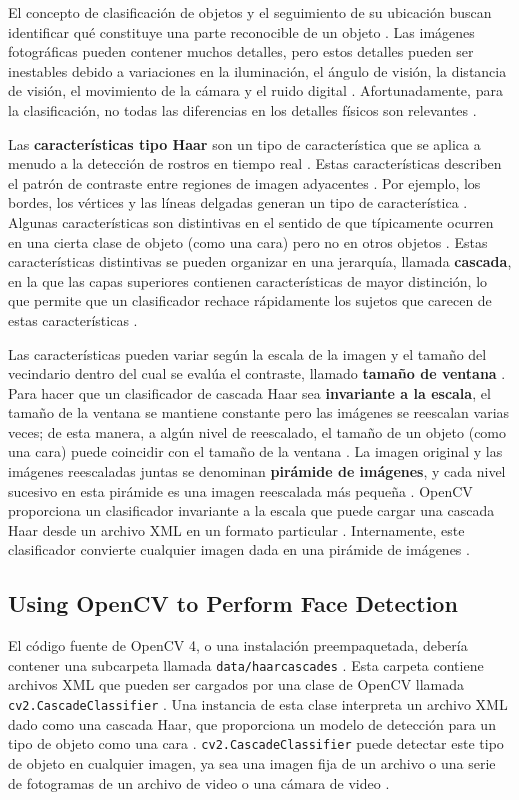 \documentclass[a4paper]{article}
\begin{document}
El concepto de clasificación de objetos y el seguimiento de su ubicación buscan identificar qué constituye una parte reconocible de un objeto . Las imágenes fotográficas pueden contener muchos detalles, pero estos detalles pueden ser inestables debido a variaciones en la iluminación, el ángulo de visión, la distancia de visión, el movimiento de la cámara y el ruido digital . Afortunadamente, para la clasificación, no todas las diferencias en los detalles físicos son relevantes .

Las \textbf{características tipo Haar} son un tipo de característica que se aplica a menudo a la detección de rostros en tiempo real . Estas características describen el patrón de contraste entre regiones de imagen adyacentes . Por ejemplo, los bordes, los vértices y las líneas delgadas generan un tipo de característica . Algunas características son distintivas en el sentido de que típicamente ocurren en una cierta clase de objeto (como una cara) pero no en otros objetos . Estas características distintivas se pueden organizar en una jerarquía, llamada \textbf{cascada}, en la que las capas superiores contienen características de mayor distinción, lo que permite que un clasificador rechace rápidamente los sujetos que carecen de estas características .

Las características pueden variar según la escala de la imagen y el tamaño del vecindario dentro del cual se evalúa el contraste, llamado \textbf{tamaño de ventana} . Para hacer que un clasificador de cascada Haar sea \textbf{invariante a la escala}, el tamaño de la ventana se mantiene constante pero las imágenes se reescalan varias veces; de esta manera, a algún nivel de reescalado, el tamaño de un objeto (como una cara) puede coincidir con el tamaño de la ventana . La imagen original y las imágenes reescaladas juntas se denominan \textbf{pirámide de imágenes}, y cada nivel sucesivo en esta pirámide es una imagen reescalada más pequeña . OpenCV proporciona un clasificador invariante a la escala que puede cargar una cascada Haar desde un archivo XML en un formato particular . Internamente, este clasificador convierte cualquier imagen dada en una pirámide de imágenes .

\subsection{Using OpenCV to Perform Face Detection}

El código fuente de OpenCV 4, o una instalación preempaquetada, debería contener una subcarpeta llamada \texttt{data/haarcascades} . Esta carpeta contiene archivos XML que pueden ser cargados por una clase de OpenCV llamada \texttt{cv2.CascadeClassifier} . Una instancia de esta clase interpreta un archivo XML dado como una cascada Haar, que proporciona un modelo de detección para un tipo de objeto como una cara . \texttt{cv2.CascadeClassifier} puede detectar este tipo de objeto en cualquier imagen, ya sea una imagen fija de un archivo o una serie de fotogramas de un archivo de video o una cámara de video .
\end{document}
